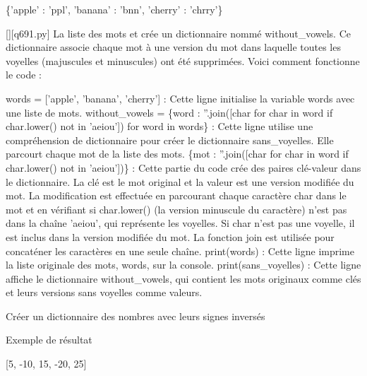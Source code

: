\{'apple' : 'ppl', 'banana' : 'bnn', 'cherry' : 'chrry'\}
        \par
        \begin{solution}
            \renewcommand{\nomfichier}{q691.py}
            \pythonfile{\chemincode \nomfichier}[][\nomfichier]
            La liste des mots et crée un dictionnaire nommé without\_vowels. Ce dictionnaire associe chaque mot à une version du mot dans laquelle toutes les voyelles (majuscules et minuscules) ont été supprimées. Voici comment fonctionne le code :

    words = ['apple', 'banana', 'cherry'] : Cette ligne initialise la variable words avec une liste de mots.
    without\_vowels = \{word : ''.join([char for char in word if char.lower() not in 'aeiou']) for word in words\} : Cette ligne utilise une compréhension de dictionnaire pour créer le dictionnaire sans\_voyelles. Elle parcourt chaque mot de la liste des mots.
        \{mot : ''.join([char for char in word if char.lower() not in 'aeiou'])\} : Cette partie du code crée des paires clé-valeur dans le dictionnaire. La clé est le mot original et la valeur est une version modifiée du mot. La modification est effectuée en parcourant chaque caractère char dans le mot et en vérifiant si char.lower() (la version minuscule du caractère) n'est pas dans la chaîne 'aeiou', qui représente les voyelles. Si char n'est pas une voyelle, il est inclus dans la version modifiée du mot. La fonction join est utilisée pour concaténer les caractères en une seule chaîne.
    print(words) : Cette ligne imprime la liste originale des mots, words, sur la console.
    print(sans\_voyelles) : Cette ligne affiche le dictionnaire without\_vowels, qui contient les mots originaux comme clés et leurs versions sans voyelles comme valeurs.
        \end{solution}
        

        \question
        Créer un dictionnaire des nombres avec leurs signes inversés

Exemple de résultat

[5, -10, 15, -20, 25]

